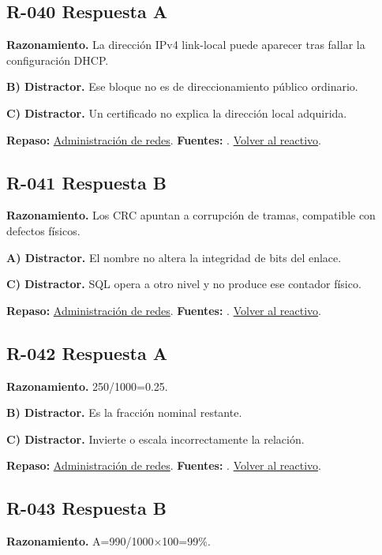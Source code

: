 \subsection*{R-040 \quad Respuesta A}\label{s:R-040}
\textbf{Razonamiento.} La dirección IPv4 link-local puede aparecer tras fallar la configuración DHCP.

\textbf{B) Distractor. }Ese bloque no es de direccionamiento público ordinario.

\textbf{C) Distractor. }Un certificado no explica la dirección local adquirida.

\textbf{Repaso:} \hyperref[sec:r2]{Administración de redes}. \textbf{Fuentes:} \cite{rfc2131,rfc1034,rfc9293,networks}. \hyperref[q:R-040]{Volver al reactivo}.\par\medskip

\subsection*{R-041 \quad Respuesta B}\label{s:R-041}
\textbf{Razonamiento.} Los CRC apuntan a corrupción de tramas, compatible con defectos físicos.

\textbf{A) Distractor. }El nombre no altera la integridad de bits del enlace.

\textbf{C) Distractor. }SQL opera a otro nivel y no produce ese contador físico.

\textbf{Repaso:} \hyperref[sec:r2]{Administración de redes}. \textbf{Fuentes:} \cite{rfc2131,rfc1034,rfc9293,networks}. \hyperref[q:R-041]{Volver al reactivo}.\par\medskip

\subsection*{R-042 \quad Respuesta A}\label{s:R-042}
\textbf{Razonamiento.} 250/1000=0.25.

\textbf{B) Distractor. }Es la fracción nominal restante.

\textbf{C) Distractor. }Invierte o escala incorrectamente la relación.

\textbf{Repaso:} \hyperref[sec:r2]{Administración de redes}. \textbf{Fuentes:} \cite{rfc2131,rfc1034,rfc9293,networks}. \hyperref[q:R-042]{Volver al reactivo}.\par\medskip

\subsection*{R-043 \quad Respuesta B}\label{s:R-043}
\textbf{Razonamiento.} A=990/1000×100=99\%.

